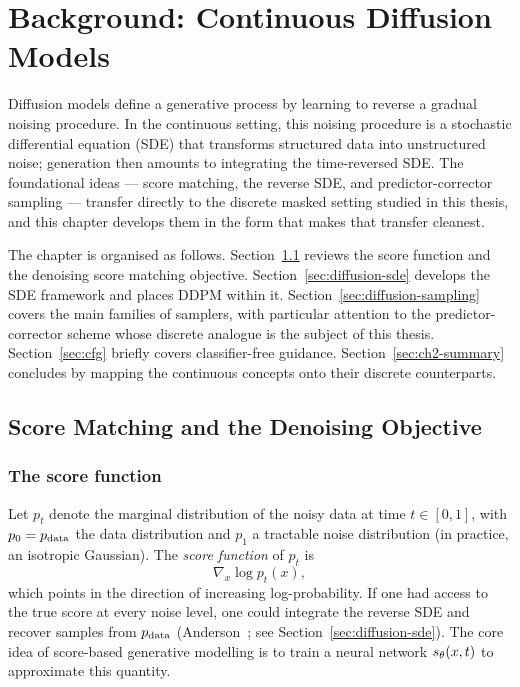 \chapter{Background: Continuous Diffusion Models}
\label{ch:background-diffusion}

Diffusion models define a generative process by learning to reverse a gradual noising
procedure. In the continuous setting, this noising procedure is a stochastic differential
equation (SDE) that transforms structured data into unstructured noise; generation then
amounts to integrating the time-reversed SDE. The foundational ideas --- score matching,
the reverse SDE, and predictor-corrector sampling --- transfer directly to the discrete
masked setting studied in this thesis, and this chapter develops them in the form that
makes that transfer cleanest.

The chapter is organised as follows. Section~\ref{sec:score-matching} reviews the score
function and the denoising score matching objective. Section~\ref{sec:diffusion-sde}
develops the SDE framework and places DDPM within it.
Section~\ref{sec:diffusion-sampling} covers the main families of samplers, with
particular attention to the predictor-corrector scheme whose discrete analogue is the
subject of this thesis. Section~\ref{sec:cfg} briefly covers classifier-free guidance.
Section~\ref{sec:ch2-summary} concludes by mapping the continuous concepts onto their
discrete counterparts.

\section{Score Matching and the Denoising Objective}
\label{sec:score-matching}

\subsection{The score function}
\label{ssec:score-function}

Let $p_t$ denote the marginal distribution of the noisy data at time $t \in [0, 1]$,
with $p_0 = p_{\mathrm{data}}$ the data distribution and $p_1$ a tractable noise distribution (in
practice, an isotropic Gaussian). The \emph{score function} of $p_t$ is
\begin{equation}
  \nabla_{x} \log p_t(x),
  \label{eq:score-function}
\end{equation}
which points in the direction of increasing log-probability. If one had access to the
true score at every noise level, one could integrate the reverse SDE and recover samples
from $p_{\mathrm{data}}$ (Anderson~\citeyear{anderson1982reverse}; see
Section~\ref{sec:diffusion-sde}). The core idea of score-based generative modelling is
to train a neural network $s_\theta(x, t)$ to approximate this quantity.


